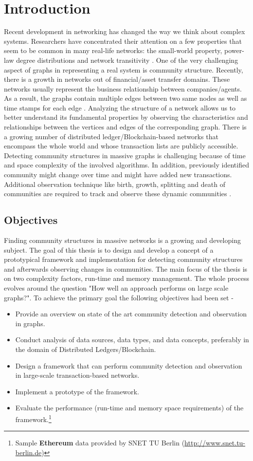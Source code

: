\chapter{Introduction}\label{cha:1_introduction}
Recent development in networking has changed the way we think about complex systems. Researchers have concentrated their attention on a few properties that seem to be common in many real-life networks: the small-world property, power-law degree distributions and network transitivity \cite{ref-1}. One of the very challenging aspect of graphs in representing a real system is community structure. Recently, there is a growth in networks out of financial/asset transfer domains. These networks usually represent the business relationship between companies/agents. As a result, the graphs contain multiple edges between two same nodes as well as time stamps for each edge \cite{ref-19}. Analyzing the structure of a network allows us to better understand its fundamental properties by observing the characteristics and relationships between the vertices and edges of the corresponding graph. There is a growing number of distributed ledger/Blockchain-based networks that encompass the whole world and whose transaction lists are publicly accessible. Detecting community structures in massive graphs is challenging because of time and space complexity of the involved algorithms. In addition, previously identified community might change over time and might have added new transactions. Additional observation technique like birth, growth, splitting and death of communities are required to track and observe these dynamic communities \cite{ref-39}.

\section{Objectives}\label{objectives}
Finding community structures in massive networks is a growing and developing subject. The goal of this thesis is to design and develop a concept of a prototypical framework and implementation for detecting community structures and afterwards observing changes in communities. The main focus of the thesis is on two complexity factors, run-time and memory management. The whole process evolves around the question "How well an approach performs on large scale graphs?". To achieve the primary goal the following objectives had been set -
\begin{itemize}
	\item Provide an overview on state of the art community detection and observation in graphs.
	\item Conduct analysis of data sources, data types, and data concepts, preferably in the domain of Distributed Ledgers/Blockchain.
	\item Design a framework that can perform community detection and observation in large-scale transaction-based networks.
	\item Implement a prototype of the framework.
	\item Evaluate the performance (run-time and memory space requirements) of the framework.\footnote{Sample \textbf{Ethereum} data provided by SNET TU Berlin (\hyperlink{SNET-TUB}{http://www.snet.tu-berlin.de})}
\end{itemize}

